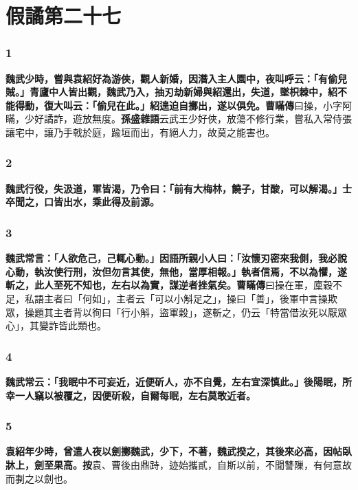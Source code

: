 \chapter{假譎第二十七}

\subsection*{1}

\textbf{魏武少時，嘗與袁紹好為游俠，觀人新婚，因潛入主人園中，夜叫呼云：「有偷兒賊。」青廬中人皆出觀，魏武乃入，抽刃劫新婦與紹還出，失道，墜枳棘中，紹不能得動，復大叫云：「偷兒在此。」紹遑迫自擲出，遂以俱免。}{\footnotesize \textbf{曹瞞傳}曰操，小字阿瞞，少好譎詐，遊放無度。\textbf{孫盛雜語}云武王少好俠，放蕩不修行業，嘗私入常侍張讓宅中，讓乃手戟於庭，踰垣而出，有絕人力，故莫之能害也。}

\subsection*{2}

\textbf{魏武行役，失汲道，軍皆渴，乃令曰：「前有大梅林，饒子，甘酸，可以解渴。」士卒聞之，口皆出水，乘此得及前源。}

\subsection*{3}

\textbf{魏武常言：「人欲危己，己輒心動。」因語所親小人曰：「汝懷刃密來我側，我必說心動，執汝使行刑，汝但勿言其使，無他，當厚相報。」執者信焉，不以為懼，遂斬之，此人至死不知也，左右以為實，謀逆者挫氣矣。}{\footnotesize \textbf{曹瞞傳}曰操在軍，廩穀不足，私語主者曰「何如」，主者云「可以小斛足之」，操曰「善」，後軍中言操欺眾，操題其主者背以徇曰「行小斛，盜軍穀」，遂斬之，仍云「特當借汝死以厭眾心」，其變詐皆此類也。}

\subsection*{4}

\textbf{魏武常云：「我眠中不可妄近，近便斫人，亦不自覺，左右宜深慎此。」後陽眠，所幸一人竊以被覆之，因便斫殺，自爾每眠，左右莫敢近者。}

\subsection*{5}

\textbf{袁紹年少時，曾遣人夜以劍擲魏武，少下，不著，魏武揆之，其後來必高，因帖臥牀上，劍至果高。}{\footnotesize \textbf{按}袁、曹後由鼎跱，迹始攜貳，自斯以前，不聞讐隟，有何意故而剚之以劍也。}

